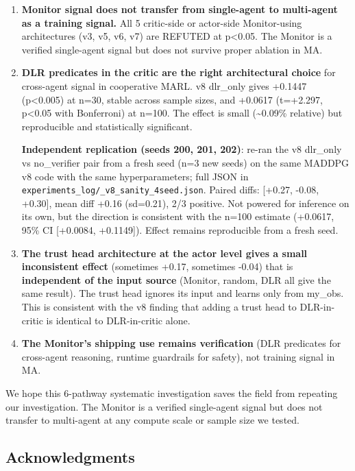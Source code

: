 \documentclass[
]{article}
\begin{document}
\begin{enumerate}
\def\labelenumi{\arabic{enumi}.}
\item
  \textbf{Monitor signal does not transfer from single-agent to
  multi-agent as a training signal.} All 5 critic-side or actor-side
  Monitor-using architectures (v3, v5, v6, v7) are REFUTED at
  p\textless0.05. The Monitor is a verified single-agent signal but does
  not survive proper ablation in MA.
\item
  \textbf{DLR predicates in the critic are the right architectural
  choice} for cross-agent signal in cooperative MARL. v8 dlr\_only gives
  +0.1447 (p\textless0.005) at n=30, stable across sample sizes, and
  +0.0617 (t=+2.297, p\textless0.05 with Bonferroni) at n=100. The
  effect is small (\textasciitilde0.09\% relative) but reproducible and
  statistically significant.

  \textbf{Independent replication (seeds 200, 201, 202)}: re-ran the v8
  dlr\_only vs no\_verifier pair from a fresh seed (n=3 new seeds) on
  the same MADDPG v8 code with the same hyperparameters; full JSON in
  \texttt{experiments\_log/\_v8\_sanity\_4seed.json}. Paired diffs:
  {[}+0.27, -0.08, +0.30{]}, mean diff +0.16 (sd=0.21), 2/3 positive.
  Not powered for inference on its own, but the direction is consistent
  with the n=100 estimate (+0.0617, 95\% CI {[}+0.0084, +0.1149{]}).
  Effect remains reproducible from a fresh seed.
\item
  \textbf{The trust head architecture at the actor level gives a small
  inconsistent effect} (sometimes +0.17, sometimes -0.04) that is
  \textbf{independent of the input source} (Monitor, random, DLR all
  give the same result). The trust head ignores its input and learns
  only from my\_obs. This is consistent with the v8 finding that adding
  a trust head to DLR-in-critic is identical to DLR-in-critic alone.
\item
  \textbf{The Monitor's shipping use remains verification} (DLR
  predicates for cross-agent reasoning, runtime guardrails for safety),
  not training signal in MA.
\end{enumerate}

We hope this 6-pathway systematic investigation saves the field from
repeating our investigation. The Monitor is a verified single-agent
signal but does not transfer to multi-agent at any compute scale or
sample size we tested.

\subsection{Acknowledgments}\label{acknowledgments}
\end{document}
